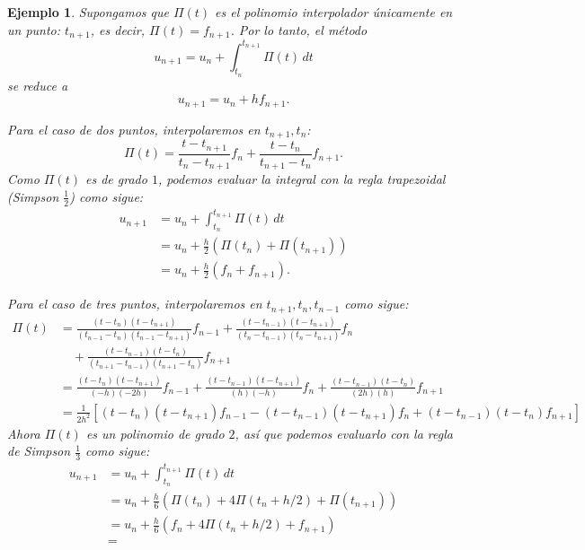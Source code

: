 \documentclass[11pt,letterpaper]{report}
\newtheorem{example}{Ejemplo}
\begin{document}
\begin{example}
  Supongamos que $\Pi(t)$ es el polinomio interpolador únicamente en
  un punto: $t_{n+1}$, es decir, $\Pi(t)=f_{n+1}$.
  Por lo tanto, el método
  \begin{equation}
    u_{n+1} = u_n + \int_{t_n}^{t_{n+1}} \Pi(t) \,dt
  \end{equation}
  se reduce a
  \begin{equation}
    u_{n+1} = u_n + hf_{n+1}.
  \end{equation}

  Para el caso de dos puntos, interpolaremos en $t_{n+1},t_n$:
   \begin{equation}
    \Pi(t)
    = \frac{t-t_{n+1}}{t_{n}-t_{n+1}}f_n
    + \frac{t-t_n}{t_{n+1}-t_n}f_{n+1}
  .\end{equation}
  Como $\Pi(t)$ es de grado $1$, podemos evaluar la integral con la
  regla trapezoidal (Simpson $\frac{1}{2}$) como sigue:
  \begin{align}
    u_{n+1}
    &= u_n + \int_{t_n}^{t_{n+1}} \Pi(t) \,dt \\
    &= u_{n} + \frac{h}{2}(\Pi(t_{n})+\Pi(t_{n+1})) \\
    &= u_{n} + \frac{h}{2}(f_{n}+f_{n+1}).
  \end{align}

  Para el caso de tres puntos, interpolaremos en $t_{n+1},t_n,t_{n-1}$ 
  como sigue:
  \begin{equation}
    \begin{split}
      \Pi(t)
      &=
      \frac{(t-t_{n})(t-t_{n+1})}{(t_{n-1}-t_n)(t_{n-1}-t_{n+1})}
      f_{n-1}
      +
      \frac{(t-t_{n-1})(t-t_{n+1})}{(t_{n}-t_{n-1})(t_{n}-t_{n+1})}
      f_{n}
      \\
      &\quad +
      \frac{(t-t_{n-1})(t-t_{n})}{(t_{n+1}-t_{n-1})(t_{n+1}-t_{n})}
      f_{n+1}
      \\
      &=
      \frac{(t-t_{n})(t-t_{n+1})}{(-h)(-2h)}
      f_{n-1}
      +
      \frac{(t-t_{n-1})(t-t_{n+1})}{(h)(-h)}
      f_{n}
      +
      \frac{(t-t_{n-1})(t-t_{n})}{(2h)(h)}
      f_{n+1}
      \\
      &=
      \frac{1}{2h^{2}}
      \left[
        (t-t_{n})(t-t_{n+1}) f_{n-1}
        - (t-t_{n-1})(t-t_{n+1}) f_{n}
        + (t-t_{n-1})(t-t_{n}) f_{n+1}
      \right]
    \end{split}
  \end{equation}
  Ahora $\Pi(t)$ es un polinomio de grado $2$, así que podemos
  evaluarlo con la regla de Simpson $\frac{1}{3}$ como sigue:
  \begin{align}
    u_{n+1}
    &= u_n + \int_{t_n}^{t_{n+1}} \Pi(t) \,dt \\
    &= u_{n}
    + \frac{h}{6}(\Pi(t_{n})+4\Pi(t_n + h / 2)+\Pi(t_{n+1})) \\
    &= u_{n}
    + \frac{h}{6}(f_{n}+4\Pi(t_n + h / 2)+f_{n+1}) \\
    &= 
  \end{align}
\end{example}
\end{document}
